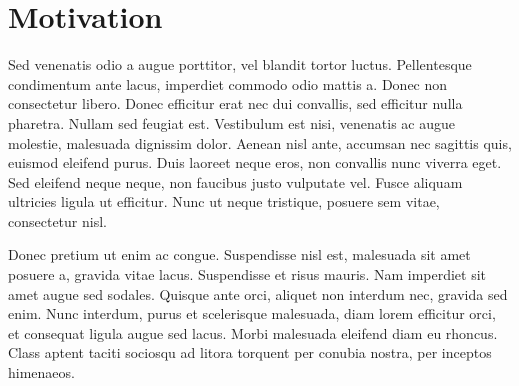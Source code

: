 \section{Motivation}
\label{sec:motivation}
Sed venenatis odio a augue porttitor, vel blandit tortor luctus. Pellentesque condimentum ante lacus, imperdiet commodo odio mattis a. Donec non consectetur libero. Donec efficitur erat nec dui convallis, sed efficitur nulla pharetra. Nullam sed feugiat est. Vestibulum est nisi, venenatis ac augue molestie, malesuada dignissim dolor. Aenean nisl ante, accumsan nec sagittis quis, euismod eleifend purus. Duis laoreet neque eros, non convallis nunc viverra eget. Sed eleifend neque neque, non faucibus justo vulputate vel. Fusce aliquam ultricies ligula ut efficitur. Nunc ut neque tristique, posuere sem vitae, consectetur nisl.

Donec pretium ut enim ac congue. Suspendisse nisl est, malesuada sit amet posuere a, gravida vitae lacus. Suspendisse et risus mauris. Nam imperdiet sit amet augue sed sodales. Quisque ante orci, aliquet non interdum nec, gravida sed enim. Nunc interdum, purus et scelerisque malesuada, diam lorem efficitur orci, et consequat ligula augue sed lacus. Morbi malesuada eleifend diam eu rhoncus. Class aptent taciti sociosqu ad litora torquent per conubia nostra, per inceptos himenaeos. 